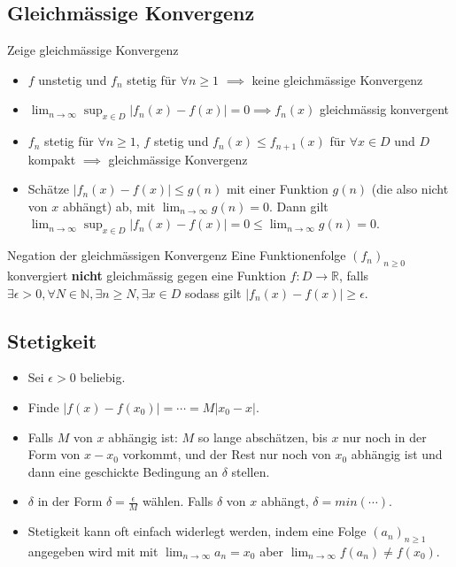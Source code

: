 \documentclass[a4paper,10pt]{article}
\def\limn{\lim_{n\to \infty}}
\begin{document}
\subsection{Gleichmässige Konvergenz}
\begin{subbox}{Zeige gleichmässige Konvergenz}
  \begin{itemize}
    \item $f$ unstetig und $f_n$ stetig für $\forall n \geq 1$ $\implies$ keine gleichmässige Konvergenz
    \item $\lim_{n \rightarrow \infty} \sup_{x \in D} |f_n(x) - f(x)| = 0 \implies f_n(x)$ gleichmässig konvergent
    \item $f_n$ stetig für $\forall n \geq 1$, $f$ stetig und $f_n(x) \leq f_{n+1}(x)$ für $\forall x \in D$ und $D$ kompakt $\implies$ gleichmässige Konvergenz
    \item Schätze $|f_n(x) - f(x)| \leq g(n)$ mit einer Funktion $g(n)$ (die also nicht von $x$ abhängt) ab, mit $\limn g(n) = 0$. Dann gilt $\lim_{n \rightarrow \infty} \sup_{x \in D} |f_n(x) - f(x)| = 0 \leq \limn g(n) = 0$.
  \end{itemize}
\end{subbox}
\begin{subbox}{Negation der gleichmässigen Konvergenz}
  Eine Funktionenfolge $(f_n)_{n \geq 0}$ konvergiert \textbf{nicht} gleichmässig gegen eine Funktion $f: D \to \mathbb{R}$, falls $\exists \epsilon > 0, \forall N \in \mathbb{N}, \exists n \geq N, \exists x \in D$ sodass gilt $|f_n(x) - f(x)| \geq \epsilon$.
\end{subbox}

\subsection{Stetigkeit}
\begin{subbox}{}
  \begin{itemize}
    \item Sei $\epsilon > 0$ beliebig.
    \item Finde $|f(x) - f(x_0)| = \cdots = M|x_0 - x|$.
    \item Falls $M$ von $x$ abhängig ist: $M$ so lange abschätzen, bis $x$ nur noch in der Form von $x - x_0$ vorkommt, und der Rest nur noch von $x_0$ abhängig ist und dann eine geschickte Bedingung an $\delta$ stellen.
    \item $\delta$ in der Form $\delta = \frac{\epsilon}{M}$ wählen. Falls $\delta$ von $x$ abhängt, $\delta = min(\cdots)$.
    \item Stetigkeit kann oft einfach widerlegt werden, indem eine Folge $(a_n)_{n \geq 1}$ angegeben wird mit mit $\limn a_n = x_0$ aber $\limn f(a_n) \neq f(x_0)$.
  \end{itemize}
\end{subbox}
\end{document}
